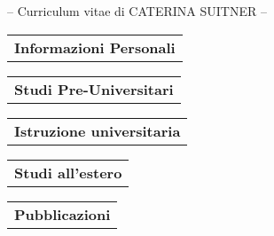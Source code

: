 \documentclass[10pt,a4paper]{article}
\newcommand{\titolo}[1]{\multicolumn{2}{l}{{\bf\large #1}}\\[4pt]}
\begin{document}
\begin{center}
{\sc\Huge -- Curriculum vitae di CATERINA SUITNER --}
\end{center}
\vspace{20pt}

\begin{tabular}{r|p{370pt}}
\titolo{Informazioni Personali}
\cline{1-1}

\end{tabular}

\vspace{15pt}

\begin{tabular}{r|p{370pt}}
\titolo{Studi Pre-Universitari}
\cline{1-1}

\end{tabular}

\vspace{15pt}

\begin{tabular}{r|p{370pt}}
\titolo{Istruzione universitaria}
\cline{1-1}

\end{tabular}

\vspace{15pt}

\begin{tabular}{r|p{340pt}}
\titolo{Studi all'estero}
\cline{1-1}

\end{tabular}

\vspace{15pt}

\begin{tabular}{r|p{370pt}}
\titolo{Pubblicazioni}
\cline{1-1}

\end{tabular}
\end{document}
